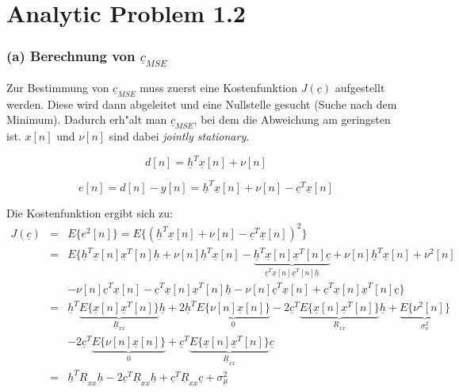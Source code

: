 \clearpage
\chapter{Analytic Problem 1.2}

\subsection{(a) Berechnung von $\underline{c}_{MSE}$}
Zur Bestimmung von $\underline{c}_{MSE}$ muss zuerst eine Kostenfunktion $J(\underline{c})$ aufgestellt werden. Diese wird dann abgeleitet und eine Nullstelle gesucht (Suche nach dem Minimum). Dadurch erh"alt man $\underline{c}_{MSE}$, bei dem die Abweichung am geringsten ist. $x[n]$ und $\nu [n]$ sind dabei \emph{jointly stationary}.

\begin{equation}
  d[n] = \underline{h}^T \underline{x}[n] + \nu [n]
\end{equation}

\begin{equation}
 e[n] = d[n] - y[n] = \underline{h}^T \underline{x}[n] + \nu [n] - \underline{c}^T \underline{x}[n]
\end{equation}

Die Kostenfunktion ergibt sich zu:
\begin{eqnarray}
 J(\underline{c}) & = & E\{e^2[n]\} = E\{(\underline{h}^T \underline{x}[n] + \nu [n] - \underline{c}^T \underline{x}[n])^2\} \\
 & = & E\{\underline{h}^T \underline{x}[n] \underline{x}^T[n] \underline{h} + \nu [n] \underline{h}^T \underline{x}[n] - \underbrace{\underline{h}^T \underline{x}[n] \underline{x}^T[n] \underline{c}}_{\underline{c}^T \underline{x}[n] \underline{x}^T[n] \underline{h}} + \nu [n] \underline{h}^T \underline{x}[n] + \nu^2[n] \\
 & & - \nu [n] \underline{c}^T \underline{x}[n] - \underline{c}^T \underline{x}[n] \underline{x}^T[n] \underline{h} - \nu [n] \underline{c}^T \underline{x}[n] + \underline{c}^T \underline{x}[n] \underline{x}^T[n] \underline{c}\} \\
 & = & \underline{h}^T \underbrace{E\{\underline{x}[n] \underline{x}^T[n]\}}_{\underline{R}_{xx}} \underline{h} + 2 \underline{h}^T \underbrace{E\{\nu [n] \underline{x}[n]\}}_{0} - 2 \underline{c}^T \underbrace{E\{\underline{x}[n] \underline{x}^T[n]\}}_{\underline{R}_{xx}} \underline{h} + \underbrace{E\{\nu^2[n]\}}_{\sigma_\nu^2} \\
 & & - 2 \underline{c}^T \underbrace{E\{\nu [n] \underline{x}[n]\}}_{0} + \underline{c}^T \underbrace{E\{\underline{x}[n] \underline{x}^T[n]\}}_{\underline{R}_{xx}} \underline{c} \\
 & = & \underline{h}^T \underline{R}_{xx} \underline{h} - 2 \underline{c}^T \underline{R}_{xx} \underline{h} + \underline{c}^T \underline{R}_{xx} \underline{c} + \sigma_\mu^2
\end{eqnarray}

